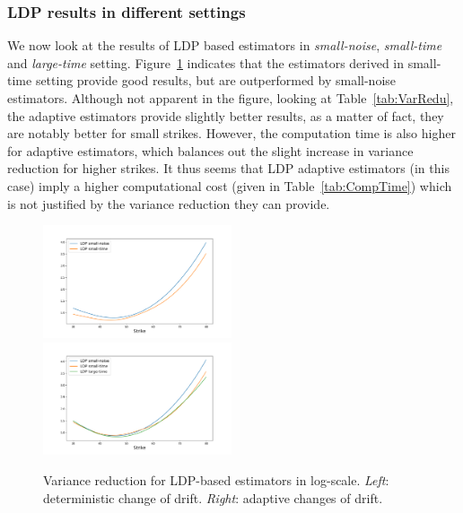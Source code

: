 \subsubsection{LDP results in different settings}
We now look at the results of LDP based estimators in \textit{small-noise}, \textit{small-time} and \textit{large-time} setting. Figure~\ref{fig:LDPvarianceRedu} indicates that the estimators derived
in small-time setting provide good results, but are outperformed by small-noise estimators. Although not apparent in the figure, looking at Table~\ref{tab:VarRedu}, the adaptive estimators provide slightly better results, as a matter of fact, they are notably better for small strikes. However, the computation time is also higher for adaptive estimators, which balances out the slight increase in variance reduction for higher strikes.
It thus seems that LDP adaptive estimators (in this case) imply a higher computational cost (given in Table~\ref{tab:CompTime}) which is not justified
by the variance reduction they can provide.
\begin{figure}[H]
    \centering
    \includegraphics[width=0.495\textwidth, trim={2cm 0.5cm 2cm 1cm }]{content/reschap3/Figures/HESTON/compare-ldp-new.pdf}
    \includegraphics[width=0.495\textwidth, trim={2cm 0.5cm 2cm 1cm }]{content/reschap3/Figures/HESTON/compare-ldpada1-new.pdf}
    \caption{Variance reduction for LDP-based estimators in log-scale. \textit{Left}: deterministic change of drift. \textit{Right}: adaptive changes of drift.}\label{fig:LDPvarianceRedu}
\end{figure}

